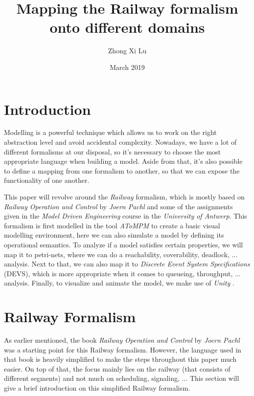 \documentclass{article}
\title{Mapping the Railway formalism onto different domains}
\author{Zhong Xi Lu}
\date{March 2019}
\begin{document}
\maketitle


\section{Introduction}

Modelling is a powerful technique which allows us to work on the right abstraction level and avoid accidental complexity. Nowadays, we have a lot of different formalisms at our disposal, so it's necessary to choose the most appropriate language when building a model. Aside from that, it's also possible to define a mapping from one formalism to another, so that we can expose the functionality of one another.

This paper will revolve around the \textit{Railway} formalism, which is mostly based on \textit{Railway Operation and Control} \cite{railway_book} by \textit{Joern Pachl} and some of the assignments \cite{assignments} given in the \textit{Model Driven Engineering} course in the \textit{University of Antwerp}. This formalism is first modelled in the tool \textit{AToMPM} \cite{atompm} to create a basic visual modelling environment, here we can also simulate a model by defining its operational semantics. To analyze if a model satisfies certain properties, we will map it to petri-nets, where we can do a reachability, coverability, deadlock, ... analysis. Next to that, we can also map it to \textit{Discrete Event System Specifications} (DEVS), which is more appropriate when it comes to queueing, throughput, ... analysis. Finally, to visualize and animate the model, we make use of \textit{Unity} \cite{unity}. 


\section{Railway Formalism}

As earlier mentioned, the book \textit{Railway Operation and Control} by \textit{Joern Pachl} \cite{railway_book} was a starting point for this Railway formalism. However, the language used in that book is heavily simplified to make the steps throughout this paper much easier. On top of that, the focus mainly lies on the railway (that consists of different segments) and not much on scheduling, signaling, ... This section will give a brief introduction on this simplified Railway formalism.
\end{document}
